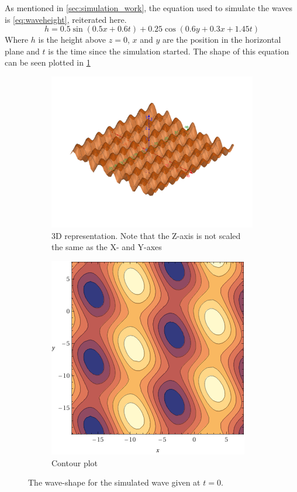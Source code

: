 \documentclass[class=article, crop=false]{standalone}
\begin{document}
As mentioned in \cref{sec:simulation_work}, the equation used to simulate the waves is \cref{eq:waveheight}, reiterated here.
\[h = 0.5\sin(0.5 x +0.6t) + 0.25\cos(0.6y + 0.3x + 1.45t)\]
Where \(h\) is the height above \(z=0\), \(x\) and \(y\) are the position in the horizontal plane and \(t\) is the time since the simulation started. The shape of this equation can be seen plotted in \cref{fig:wave-shape}

\begin{figure}
    \centering
    \begin{subfigure}{0.45\textwidth}
        \centering
        \includegraphics{wave-shape}
        \caption{3D representation. Note that the Z-axis is not scaled the same as the X- and Y-axes}
    \end{subfigure}
    \hfill
    \begin{subfigure}{0.45\textwidth}
        \centering
        \includegraphics{wave-contour}
        \caption{Contour plot}
    \end{subfigure}
    \caption{The wave-shape for the simulated wave given at \(t=0\).}
    \label{fig:wave-shape}
\end{figure}
\end{document}
